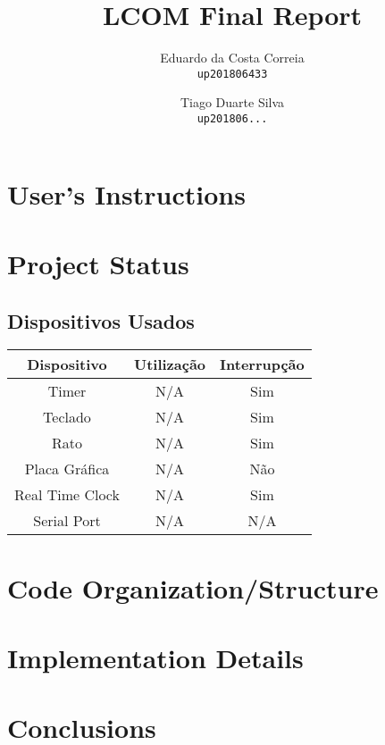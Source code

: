 \documentclass{report}
\begin{document}
\title{LCOM Final Report}
\author{Eduardo da Costa Correia\\
        \texttt{up201806433}
        \and
        Tiago Duarte Silva\\
        \texttt{up201806...}}   
\maketitle

\tableofcontents

\chapter{User's Instructions} 

\chapter{Project Status}

\section{Dispositivos Usados}

\begin{center}
	\begin{tabular}{ |c|c|c| } 
		\hline
			Dispositivo & Utilização & Interrupção \\ 
		\hline
		\hline
			Timer & N/A & Sim \\ 
			Teclado & N/A & Sim \\ 
			Rato & N/A & Sim\\
			Placa Gráfica & N/A & Não\\
			Real Time Clock & N/A & Sim\\
			Serial Port & N/A & N/A \\
		\hline
	\end{tabular}
\end{center}

\chapter{Code Organization/Structure}

\chapter{Implementation Details}

\chapter{Conclusions}
\end{document}
